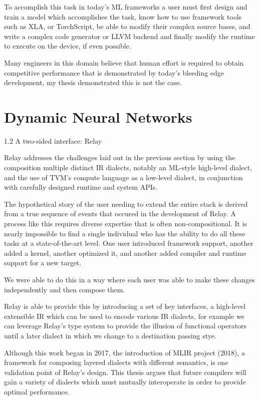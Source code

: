 To accomplish this task in today’s ML frameworks a user must first design and train a model which accomplishes the task, know how to use framework tools such as XLA, or TorchScript, be able to modify their complex source bases, and write a complex code generator or LLVM backend and finally modify the runtime to execute on the device, if even possible.

Many engineers in this domain believe that human effort is required to obtain competitive performance that is demonstrated by today’s bleeding edge development, my thesis demonstrated this is not the case.

\section{Dynamic Neural Networks}
1.2 A two-sided interface: Relay

Relay addresses the challenges laid out in the previous section by using the composition multiple distinct IR dialects, notably an ML-style high-level dialect, and the use of TVM’s compute language as a low-level dialect, in conjunction with carefully designed runtime and system APIs.

The hypothetical story of the user needing to extend the entire stack is derived from a true sequence of events that occured in the development of Relay. A process like this requires diverse expertise that is often non-compositional. It is nearly impossible to find a single individual who has the ability to do all these tasks at a state-of-the-art level.  One user introduced framework support, another added a kernel, another optimized it, and another added compiler and runtime support for a new target.

We were able to do this in a way where each user was able to make these changes independently and then compose them.

Relay is able to provide this by introducing a set of key interfaces, a high-level extensible IR which can be used to encode various IR dialects, for example we can leverage Relay’s type system to provide the illusion of functional operators until a later dialect in which we change to a destination passing stye.

Although this work began in 2017, the introduction of MLIR project (2018), a framework for composing layered dialects with different semantics, is one validation point of Relay’s design. This thesis argues that future compilers will gain a variety of dialects which must mutually interoperate in order to provide optimal performance.

